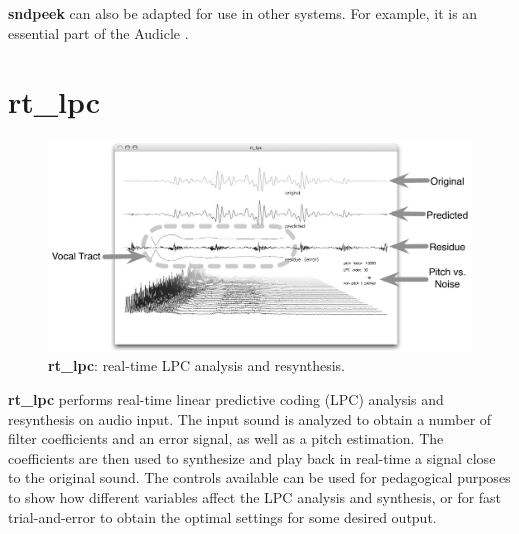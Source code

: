 \documentclass{article}
\begin{document}


{\bf sndpeek} can also be adapted for use in other systems. For example, it is an 
essential part of the Audicle \cite{Wang:04}. 

\section{rt\_lpc}

\begin{figure}[t]
\center
\includegraphics[width=1\textwidth]{rt_lpc_bw}
\caption{{\bf rt\_lpc}: real-time LPC analysis and resynthesis.}
\label{fig:f_lpc}
\end{figure}

{\bf rt\_lpc} performs real-time linear predictive coding (LPC) \cite{Atal:70, Lansky:81, Markel:76, Moorer:79} analysis and resynthesis on audio input. The input sound is analyzed to obtain a number of filter coefficients and an error signal, as well as a pitch estimation. The coefficients are then used to synthesize and play back in real-time a signal close to the original sound. The controls available can be used for pedagogical purposes to show how different variables affect the LPC analysis and synthesis, or for fast trial-and-error to obtain the optimal settings for some desired output. 

\end{document}
